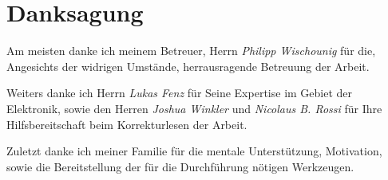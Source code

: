 \section*{Danksagung}

Am meisten danke ich meinem Betreuer, Herrn \textit{Philipp Wischounig} für die, Angesichts der widrigen Umstände, herrausragende Betreuung der Arbeit.

Weiters danke ich Herrn \textit{Lukas Fenz} für Seine Expertise im Gebiet der Elektronik, sowie den Herren \textit{Joshua Winkler} und \textit{Nicolaus B. Rossi} für Ihre Hilfsbereitschaft beim Korrekturlesen der Arbeit.

Zuletzt danke ich meiner Familie für die mentale Unterstützung, Motivation, sowie die Bereitstellung der für die Durchführung nötigen Werkzeugen.

\newpage